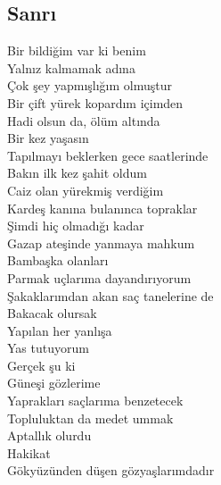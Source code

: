 \subsection{Sanrı}

Bir bildiğim var ki benim \\
Yalnız kalmamak adına \\
Çok şey yapmışlığım olmuştur \\
Bir çift yürek kopardım içimden \\
Hadi olsun da, ölüm altında \\
Bir kez yaşasın \\

\noindent\newline
Tapılmayı beklerken gece saatlerinde \\
Bakın ilk kez şahit oldum \\
Caiz olan yürekmiş verdiğim \\
Kardeş kanına bulanınca topraklar \\

\noindent\newline
Şimdi hiç olmadığı kadar \\
Gazap ateşinde yanmaya mahkum \\
Bambaşka olanları \\
Parmak uçlarıma dayandırıyorum \\

\noindent\newline
Şakaklarımdan akan saç tanelerine de \\
Bakacak olursak \\
Yapılan her yanlışa \\
Yas tutuyorum \\

\noindent\newline
Gerçek şu ki \\
Güneşi gözlerime \\
Yaprakları saçlarıma benzetecek \\
Topluluktan da medet ummak \\
Aptallık olurdu \\

\noindent\newline
Hakikat \\
Gökyüzünden düşen gözyaşlarımdadır \\